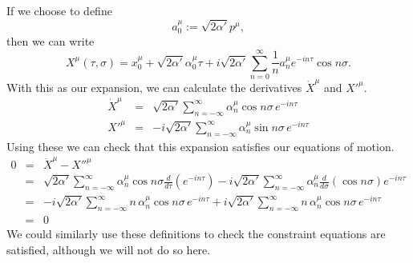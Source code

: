 \documentclass[a4paper,12pt]{article}
\numberwithin{equation}{section}
\begin{document}
If we choose to define
\begin{equation}\label{pmudefn}
a_0^\mu := \sqrt{2\alpha'}p^\mu,
\end{equation}
then we can write
\begin{equation}\label{modeexp}
X^\mu (\tau, \sigma) = x_0^\mu + \sqrt{2\alpha'} \alpha_0^\mu \tau + i\sqrt{2\alpha'}\sum_{n=0}^\infty \frac{1}{n} a_n^\mu e^{-in\tau} \cos n\sigma.
\end{equation}
With this as our expansion, we can calculate the derivatives $\dot{X}^\mu$ and $X'^\mu$.
\begin{eqnarray}
\dot{X}^\mu & = &\sqrt{2\alpha'}\sum_{n=-\infty}^\infty \alpha_n^\mu \cos n\sigma\, e^{-in\tau}\label{xdotdefn} \\
X'^\mu &=& -i\sqrt{2\alpha'}\sum_{n=-\infty}^\infty \alpha_n^\mu \sin n\sigma\, e^{-in\tau}\label{xdashdefn}
\end{eqnarray}
Using these we can check that this expansion satisfies our equations of motion.
\begin{eqnarray*}
0 &= &\ddot{X}^\mu -X''^\mu\\
& = & \sqrt{2\alpha'} \sum_{n=-\infty}^\infty \alpha_n^\mu \cos n\sigma\frac{d}{d\tau}( e^{-in\tau}) - i\sqrt{2\alpha'}\sum_{n=-\infty}^\infty \alpha_n^\mu \frac{d}{d\sigma}(\cos n\sigma)e^{-in\tau}\\
& =& -i\sqrt{2\alpha'} \sum_{n=-\infty}^\infty n\,\alpha_n^\mu \cos n\sigma \, e^{-in\tau} + i\sqrt{2\alpha'}\sum_{n=-\infty}^\infty n\,\alpha_n^\mu \cos n\sigma \, e^{-in\tau}\\
& = & 0
\end{eqnarray*}
We could similarly use these definitions to check the constraint equations are satisfied, although we will not do so here.
\end{document}
